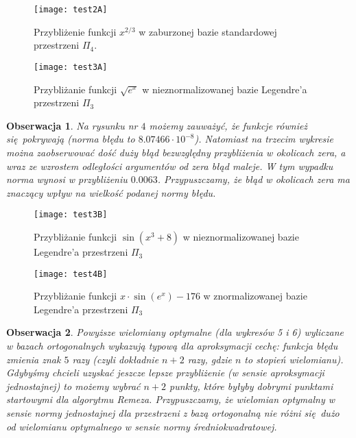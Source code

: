 \documentclass{article}
\newtheorem{obserwacja}{Obserwacja}
\begin{document}
\pagebreak

\begin{figure}[h!]
	\centering
	\texttt{[image: test2A]}
	\caption{Przybliżenie funkcji $x^{2/3}$ w zaburzonej bazie standardowej przestrzeni $\Pi_4$. }
\end{figure}

\begin{figure}[h!]
	\centering
	\texttt{[image: test3A]}
	\caption{Przybliżanie funkcji $\sqrt{e^x}$ w nieznormalizowanej bazie Legendre'a przestrzeni $\Pi_3$}
\end{figure}

\begin{obserwacja}
Na rysunku nr $4$ możemy zauważyć, że funkcje również się pokrywają (norma błędu to $8.07466 \cdot 10^{-8}$). Natomiast na trzecim wykresie można zaobserwować dość duży błąd bezwzględny przybliżenia w okolicach zera, a wraz ze wzrostem odległości argumentów od zera błąd maleje. W tym wypadku norma wynosi w przybliżeniu $0.0063$. Przypuszczamy, że błąd w okolicach zera ma znaczący wpływ na wielkość podanej normy błędu.
\end{obserwacja}

\pagebreak

\begin{figure}[h!]
	\centering
	\texttt{[image: test3B]}
	\caption{Przybliżanie funkcji $\sin(x^3+8)$ w nieznormalizowanej bazie Legendre'a przestrzeni $\Pi_3$}
\end{figure}

\begin{figure}[h!]
	\centering
	\texttt{[image: test4B]}
	\caption{Przybliżanie funkcji $x \cdot \sin(e^x)-176$ w znormalizowanej bazie Legendre'a przestrzeni $\Pi_3$}
\end{figure}

\begin{obserwacja}	
Powyższe wielomiany optymalne (dla wykresów 5 i 6) wyliczane w bazach ortogonalnych wykazują typową dla aproksymacji cechę: funkcja błędu zmienia znak $5$ razy (czyli dokładnie $n+2$ razy, gdzie $n$ to stopień wielomianu). Gdybyśmy chcieli uzyskać jeszcze lepsze przybliżenie (w sensie aproksymacji jednostajnej) to możemy wybrać $n+2$ punkty, które byłyby dobrymi punktami startowymi dla algorytmu Remeza. Przypuszczamy, że wielomian optymalny w sensie normy jednostajnej dla przestrzeni z bazą ortogonalną nie różni się dużo od wielomianu optymalnego w sensie normy średniokwadratowej.
\end{obserwacja}
\end{document}
